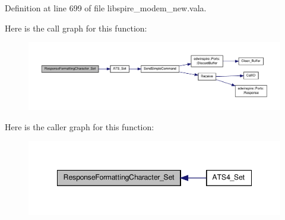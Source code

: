 Definition at line 699 of file libspire\-\_\-modem\-\_\-new.\-vala.



Here is the call graph for this function\-:\nopagebreak
\begin{figure}[H]
\begin{center}
\leavevmode
\includegraphics[width=350pt]{classedwinspire_1_1_ports_1_1_modem_a92612ec64b1ea35910823424f2d16049_cgraph}
\end{center}
\end{figure}




Here is the caller graph for this function\-:\nopagebreak
\begin{figure}[H]
\begin{center}
\leavevmode
\includegraphics[width=348pt]{classedwinspire_1_1_ports_1_1_modem_a92612ec64b1ea35910823424f2d16049_icgraph}
\end{center}
\end{figure}


